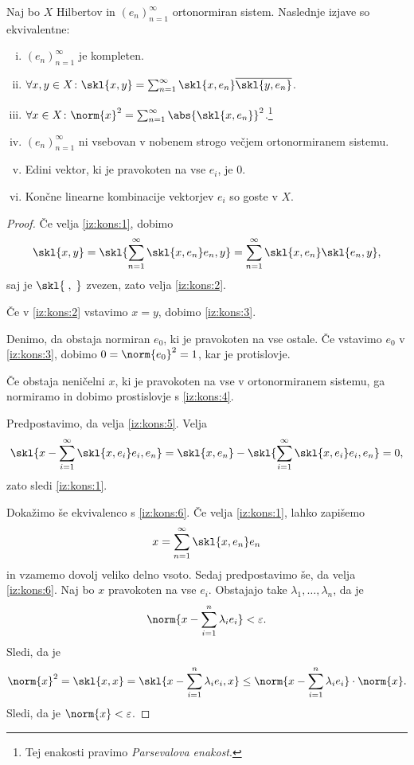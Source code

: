 \begin{izrek}
\label{iz:kons:kar}
Naj bo $X$ Hilbertov in $(e_n)_{n=1}^\infty$ ortonormiran sistem.
Naslednje izjave so ekvivalentne:

\begin{enumerate}[i)]
\item
\label{iz:kons:1}
$(e_n)_{n=1}^\infty$ je kompleten.
\item
\label{iz:kons:2}
$\forall x,y \in X \colon
\skl{x,y} = \sum_{n=1}^\infty \skl{x,e_n} \overline{\skl{y,e_n}}$.
\item
\label{iz:kons:3}
$\forall x \in X \colon \norm{x}^2 =
\sum_{n=1}^\infty \abs{\skl{x,e_n}}^2$.\footnote{Tej enakosti
pravimo \emph{Parsevalova enakost}.}
\item
\label{iz:kons:4}
$(e_n)_{n=1}^\infty$ ni vsebovan v nobenem strogo večjem
ortonormiranem sistemu.
\item
\label{iz:kons:5}
Edini vektor, ki je pravokoten na vse $e_i$, je $0$.
\item
\label{iz:kons:6}
Končne linearne kombinacije vektorjev $e_i$ so goste v $X$.
\end{enumerate}
\end{izrek}

\begin{proof}
Če velja \ref{iz:kons:1}, dobimo
\[
\skl{x,y} =
\skl{\sum_{n=1}^\infty \skl{x,e_n}e_n,y} =
\sum_{n=1}^\infty \skl{x,e_n} \skl{e_n,y},
\]
saj je $\skl{\;,\;}$ zvezen, zato velja \ref{iz:kons:2}.

Če v \ref{iz:kons:2} vstavimo $x=y$, dobimo \ref{iz:kons:3}.

Denimo, da obstaja normiran $e_0$, ki je pravokoten na vse
ostale. Če vstavimo $e_0$ v \ref{iz:kons:3}, dobimo
$0 = \norm{e_0}^2 = 1$, kar je protislovje.

Če obstaja neničelni $x$, ki je pravokoten na vse v ortonormiranem
sistemu, ga normiramo in dobimo prostislovje s \ref{iz:kons:4}.

Predpostavimo, da velja \ref{iz:kons:5}. Velja
\[
\skl{x-\sum_{i=1}^\infty \skl{x,e_i}e_i,e_n} =
\skl{x,e_n} - \skl{\sum_{i=1}^\infty \skl{x,e_i}e_i,e_n} =
0,
\]
zato sledi \ref{iz:kons:1}.

Dokažimo še ekvivalenco s \ref{iz:kons:6}. Če velja
\ref{iz:kons:1}, lahko zapišemo
\[
x = \sum_{n=1}^\infty \skl{x,e_n} e_n
\]
in vzamemo dovolj veliko delno vsoto. Sedaj predpostavimo še, da
velja \ref{iz:kons:6}. Naj bo $x$ pravokoten na vse $e_i$.
Obstajajo take $\lambda_1,\dots,\lambda_n$, da je
\[
\norm{x-\sum_{i=1}^n \lambda_i e_i} < \varepsilon.
\]
Sledi, da je
\[
\norm{x}^2 =
\skl{x,x} =
\skl{x-\sum_{i=1}^n \lambda_i e_i,x} \leq
\norm{x-\sum_{i=1}^n \lambda_i e_i} \cdot \norm{x}.
\]
Sledi, da je $\norm{x} < \varepsilon$.
\end{proof}

